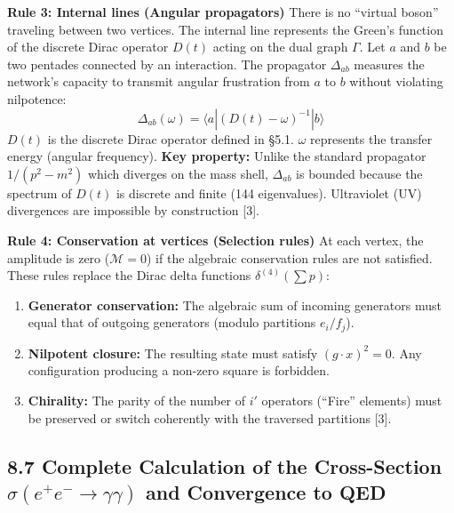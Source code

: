 \documentclass[11pt]{article}
\providecommand{\tightlist}{\setlength{\itemsep}{2pt}\setlength{\parskip}{6pt}}
\let\oldmathcal\mathcal
\renewcommand{\mathcal}[1]{\oldmathcal{#1}}
\providecommand{\tightlist}{%
  \setlength{\itemsep}{2pt}\setlength{\parskip}{6pt}
}
\begin{document}
\textbf{Rule 3: Internal lines (Angular propagators)} There is no
``virtual boson'' traveling between two vertices. The internal line
represents the Green's function of the discrete Dirac operator \(D(t)\)
acting on the dual graph \(\Gamma\). Let \(a\) and \(b\) be two pentades
connected by an interaction. The propagator \(\Delta_{ab}\) measures the
network's capacity to transmit angular frustration from \(a\) to \(b\)
without violating nilpotence: \[
\Delta_{ab}(\omega) = \langle a | \left( D(t) - \omega \right)^{-1} | b \rangle
\] \(D(t)\) is the discrete Dirac operator defined in §5.1. \(\omega\)
represents the transfer energy (angular frequency). \textbf{Key
property:} Unlike the standard propagator \(1/(p^2 - m^2)\) which
diverges on the mass shell, \(\Delta_{ab}\) is bounded because the
spectrum of \(D(t)\) is discrete and finite (144 eigenvalues).
Ultraviolet (UV) divergences are impossible by construction {[}3{]}.

\textbf{Rule 4: Conservation at vertices (Selection rules)} At each
vertex, the amplitude is zero (\(\mathcal{M}=0\)) if the algebraic
conservation rules are not satisfied. These rules replace the Dirac
delta functions \(\delta^{(4)}(\sum p)\):

\begin{enumerate}
\def\labelenumi{\arabic{enumi}.}
\tightlist
\item
  \textbf{Generator conservation:} The algebraic sum of incoming
  generators must equal that of outgoing generators (modulo partitions
  \(e_i/f_j\)).
\item
  \textbf{Nilpotent closure:} The resulting state must satisfy
  \((g \cdot x)^2 = 0\). Any configuration producing a non-zero square
  is forbidden.
\item
  \textbf{Chirality:} The parity of the number of \(i'\) operators
  (``Fire'' elements) must be preserved or switch coherently with the
  traversed partitions {[}3{]}.
\end{enumerate}

\hypertarget{complete-calculation-of-the-cross-section-sigmaee--to-gammagamma-and-convergence-to-qed}{%
\subsection{\texorpdfstring{8.7 Complete Calculation of the
Cross-Section \(\sigma(e^+e^- \to \gamma\gamma)\) and Convergence to
QED}{8.7 Complete Calculation of the Cross-Section \textbackslash sigma(e\^{}+e\^{}- \textbackslash to \textbackslash gamma\textbackslash gamma) and Convergence to QED}}\label{complete-calculation-of-the-cross-section-sigmaee--to-gammagamma-and-convergence-to-qed}}
\end{document}
